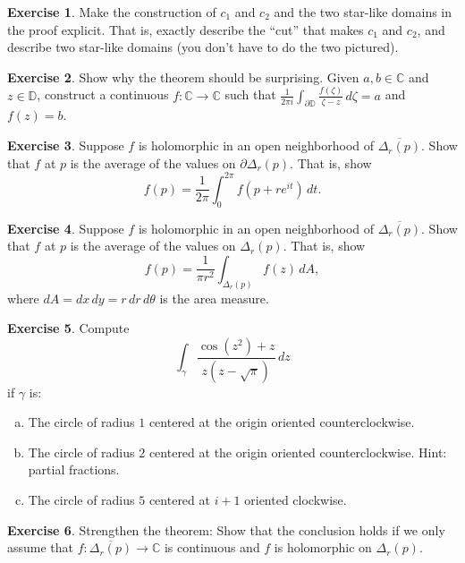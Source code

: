 \documentclass[12pt,openany]{book}
\newcommand{\C}{{\mathbb{C}}}
\newcommand{\D}{{\mathbb{D}}}
\newcommand{\myquote}[1]{``#1''}
\theoremstyle{plain}
\theoremstyle{remark}
\theoremstyle{definition}
\newenvironment{exbox}{%
    \def\FrameCommand{\vrule width 1pt \relax\hspace{10pt}}%
    \MakeFramed{\advance\hsize-\width\FrameRestore}%
}{%
    \endMakeFramed
}
\newenvironment{exparts}{%
    \leavevmode\begin{enumerate}[a),noitemsep,topsep=0pt,parsep=0pt,partopsep=0pt]
}{%
    \end{enumerate}
}
\theoremstyle{exercise}
\newtheorem{exercise}{Exercise}[section]
\theoremstyle{example}
\begin{document}
\begin{exbox}
\begin{exercise}
Make the construction of $c_1$ and $c_2$ and the two star-like domains
in the proof explicit.  That is, exactly describe the \myquote{cut} that makes
$c_1$ and $c_2$, and describe two star-like domains (you don't have to do the
two pictured).
\end{exercise}

\begin{exercise}
Show why the theorem should be surprising.  Given $a,b \in \C$ and $z \in \D$,
construct a continuous 
$f \colon \C \to \C$ such that $\frac{1}{2\pi i}\int_{\partial \D}
\frac{f(\zeta)}{\zeta -z} \, d\zeta = a$ and $f(z) = b$.
\end{exercise}

\begin{exercise}
Suppose $f$ is holomorphic in an open neighborhood of $\overline{\Delta_r(p)}$.
Show that $f$ at $p$ is the average of the values on $\partial \Delta_r(p)$.
That is, show
\begin{equation*}
f(p) = \frac{1}{2\pi} \int_0^{2\pi} f(p + r e^{it}) \, dt .
\end{equation*}
\end{exercise}

\begin{exercise}
Suppose $f$ is holomorphic in an open neighborhood of $\overline{\Delta_r(p)}$.
Show that $f$ at $p$ is the average of the values on $\Delta_r(p)$.
That is, show
\begin{equation*}
f(p) = \frac{1}{\pi r^2} \int_{\Delta_r(p)} f(z) \, dA ,
\end{equation*}
%
where $dA = dx \, dy = r \, dr \, d\theta$ is the area measure.
\end{exercise}

\begin{exercise}
Compute 
\begin{equation*}
\int_\gamma \frac{\cos ( z^2 ) +z}{z(z-\sqrt{\pi})} \, dz
\end{equation*}
if $\gamma$ is:
\begin{exparts}
\item
The circle of radius $1$ centered at the origin oriented
counterclockwise.
\item
The circle of radius $2$ centered at the origin oriented
counterclockwise.  Hint: partial fractions.
\item
The circle of radius $5$ centered at $i+1$ oriented clockwise.
\end{exparts}
\end{exercise}

\begin{exercise} \label{exercise:strongerCIFdisc}
Strengthen the theorem:  Show that the conclusion holds if
we only assume that $f \colon \overline{\Delta_r(p)} \to \C$
is continuous and $f$ is holomorphic on $\Delta_r(p)$.
\end{exercise}
\end{exbox}
\end{document}
